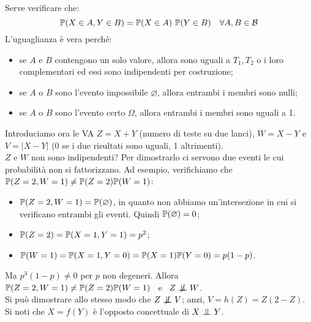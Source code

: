 \begin{ese}
  Serve verificare che:
  $$\mathbb P(X \in A, Y \in B)=\mathbb P(X \in A) \ \mathbb P( Y \in B) \quad \forall A,B \in \mathcal B $$
  L'uguaglianza è vera perché:
  \begin{itemize}
    \item se $A$ e $B$ contengono un solo valore, allora sono uguali a $T_1, T_2$ o i loro complementari ed essi sono indipendenti per costruzione;
    \item se $A$ o $B$ sono l'evento impossibile $\varnothing$, allora entrambi i membri sono nulli;
    \item se $A$ o $B$ sono l'evento certo $\Omega$, allora entrambi i membri sono uguali a 1.
  \end{itemize}

  Introduciamo ora le VA $Z=X+Y$ (numero di teste su due lanci), $W=X-Y$ e $V=\left | X-Y \right |$ (0 se i due risultati sono uguali, 1 altrimenti). \\
  $Z$ e $W$ non sono indipendenti? Per dimostrarlo ci servono due eventi le cui probabilità non si fattorizzano. Ad esempio, verifichiamo che $\mathbb P(Z=2, W=1)\ne\mathbb P(Z=2)\mathbb P(W=1)$:
  \begin{itemize}
    \item $\mathbb P(Z=2,W=1)=\mathbb P(\varnothing)$, in quanto non abbiamo un'intersezione in cui si verificano entrambi gli eventi. Quindi $\mathbb P(\varnothing)=0$;
    \item $\mathbb P(Z=2)=\mathbb P(X=1,Y=1)=p^2$;
    \item $\mathbb P(W=1)=\mathbb P(X=1,Y=0)=\mathbb P(X=1)\mathbb P(Y=0)=p(1-p)$.
  \end{itemize}
  Ma $p^3(1-p) \neq 0$ per $p$ non degeneri. Allora $\mathbb P(Z=2, W=1)\ne\mathbb P(Z=2)\mathbb P(W=1)\enspace$ e $\enspace Z \centernot\indep W$. \\
  Si può dimostrare allo stesso modo che $Z \notindep V$; anzi, $V=h(Z)=Z(2-Z)$. Si noti che $X = f(Y)$ è l'opposto concettuale di $X \indep Y$.
\end{ese}

